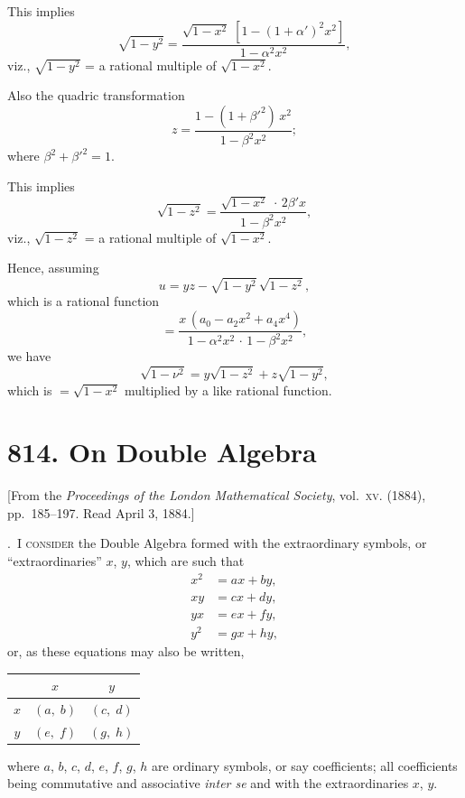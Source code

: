 \documentclass[11pt,a4paper]{article}
\theoremstyle{plain}
\theoremstyle{definition}
\theoremstyle{remark}
\begin{document}
This implies
\[
\sqrt{1-y^2} = \frac{\sqrt{1-x^2}\;[1 - (1+\alpha')^2 x^2]}{1 - \alpha^2 x^2},
\]
viz., $\sqrt{1-y^2}$ = a rational multiple of $\sqrt{1-x^2}$.

Also the quadric transformation
\[
z = \frac{1 - (1+\beta'^2)\,x^2}{1 - \beta^2 x^2};
\]
where $\beta^2 + \beta'^2 = 1$.

This implies
\[
\sqrt{1-z^2} = \frac{\sqrt{1-x^2}\;\cdot\,2\beta' x}{1 - \beta^2 x^2},
\]
viz., $\sqrt{1-z^2}$ = a rational multiple of $\sqrt{1-x^2}$.

Hence, assuming
\[
u = yz - \sqrt{1-y^2}\,\sqrt{1-z^2},
\]
which is a rational function
\[
= \frac{x\,(a_0 - a_2 x^2 + a_4 x^4)}{1 - \alpha^2 x^2\,\cdot\,1 - \beta^2 x^2},
\]
we have
\[
\sqrt{1-\nu^2} = y\sqrt{1-z^2} + z\sqrt{1-y^2},
\]
which is $= \sqrt{1-x^2}$ multiplied by a like rational function.


\newpage
\section*{814. On Double Algebra}

\begin{center}
\small[From the \textit{Proceedings of the London Mathematical Society}, vol.~\textsc{xv}. (1884),\\
pp.~185--197. Read April 3, 1884.]
\end{center}

\bigskip

.~\textsc{I consider} the Double Algebra formed with the extraordinary symbols, or ``extraordinaries'' $x$, $y$, which are such that
\begin{align*}
x^2 &= ax + by,\\
xy &= cx + dy,\\
yx &= ex + fy,\\
y^2 &= gx + hy,
\end{align*}
or, as these equations may also be written,
\begin{center}
\begin{tabular}{c|cc}
& $x$ & $y$ \\
\hline
$x$ & $(a,\;b)$ & $(c,\;d)$ \\
$y$ & $(e,\;f)$ & $(g,\;h)$ \\
\end{tabular}
\end{center}
\smallskip
where $a$, $b$, $c$, $d$, $e$, $f$, $g$, $h$ are ordinary symbols, or say coefficients; all coefficients being commutative and associative \textit{inter se} and with the extraordinaries $x$, $y$.
\end{document}
